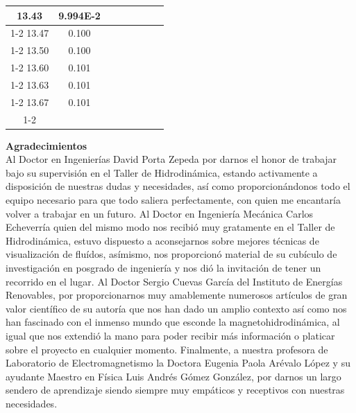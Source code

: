 \documentclass[article,12pt]{elsarticle}
\begin{document}
\begin{longtable}[c]{|c|c|cccccc}
13.43    & 9.994E-2  &                       &                              &                            &                       &                              &                               \\ \cline{1-2}
13.47    & 0.100     &                       &                              &                            &                       &                              &                               \\ \cline{1-2}
13.50    & 0.100     &                       &                              &                            &                       &                              &                               \\ \cline{1-2}
13.60    & 0.101     &                       &                              &                            &                       &                              &                               \\ \cline{1-2}
13.63    & 0.101     &                       &                              &                            &                       &                              &                               \\ \cline{1-2}
13.67    & 0.101     &                       &                              &                            &                       &                              &                               \\ \cline{1-2}
\end{longtable}

{\bf Agradecimientos} \\ 

Al Doctor en Ingenierías David Porta Zepeda por darnos el honor de trabajar bajo su supervisión en el Taller de Hidrodinámica, estando activamente a disposición de nuestras dudas y necesidades, así como proporcionándonos todo el equipo necesario para que todo saliera perfectamente, con quien me encantaría volver a trabajar en un futuro. Al Doctor en Ingeniería Mecánica Carlos Echeverría quien del mismo modo nos recibió muy gratamente en el Taller de Hidrodinámica, estuvo dispuesto a aconsejarnos sobre mejores técnicas de visualización de fluídos, asímismo, nos proporcionó material de su cubículo de investigación en posgrado de ingeniería y nos dió la invitación de tener un recorrido en el lugar. Al Doctor Sergio Cuevas García del Instituto de Energías Renovables, por proporcionarnos muy amablemente numerosos artículos de gran valor científico de su autoría que nos han dado un amplio contexto así como nos han fascinado con el inmenso mundo que esconde la magnetohidrodinámica, al igual que nos extendió la mano para poder recibir más información o platicar sobre el proyecto en cualquier momento.
Finalmente, a nuestra profesora de Laboratorio de Electromagnetismo la Doctora Eugenia Paola Arévalo López y su ayudante Maestro en Física Luis Andrés Gómez González, por darnos un largo sendero de aprendizaje siendo siempre muy empáticos y receptivos con nuestras necesidades.\\
\end{document}

